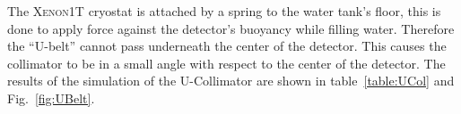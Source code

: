 The \textsc{Xenon1T} cryostat  is attached by a spring to the water tank's floor, this is done to apply force against the detector's buoyancy while filling water. Therefore the ``U-belt'' cannot pass underneath the center of the detector. This causes the collimator to be in a small angle with respect to the center of the detector.
The results of the simulation of the U-Collimator are shown in table~\ref{table:UCol} and Fig.~\ref{fig:UBelt}. 



\begin{table}
\begin{center}
\label{table:UCol}
\end{center}
\end{table}


